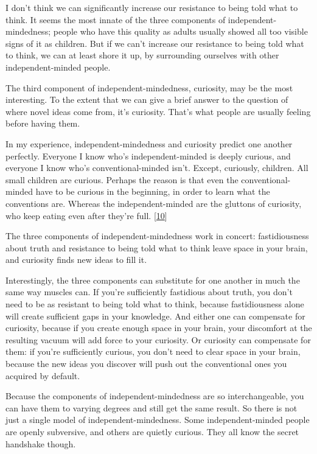 I don't think we can significantly increase our resistance to being told
what to think. It seems the most innate of the three components of
independent-mindedness; people who have this quality as adults usually
showed all too visible signs of it as children. But if we can't increase
our resistance to being told what to think, we can at least shore it up,
by surrounding ourselves with other independent-minded people.

The third component of independent-mindedness, curiosity, may be the
most interesting. To the extent that we can give a brief answer to the
question of where novel ideas come from, it's curiosity. That's what
people are usually feeling before having them.

In my experience, independent-mindedness and curiosity predict one
another perfectly. Everyone I know who's independent-minded is deeply
curious, and everyone I know who's conventional-minded isn't. Except,
curiously, children. All small children are curious. Perhaps the reason
is that even the conventional-minded have to be curious in the
beginning, in order to learn what the conventions are. Whereas the
independent-minded are the gluttons of curiosity, who keep eating even
after they're full. {[}\hyperref[f10n]{10}{]}

The three components of independent-mindedness work in concert:
fastidiousness about truth and resistance to being told what to think
leave space in your brain, and curiosity finds new ideas to fill it.

Interestingly, the three components can substitute for one another in
much the same way muscles can. If you're sufficiently fastidious about
truth, you don't need to be as resistant to being told what to think,
because fastidiousness alone will create sufficient gaps in your
knowledge. And either one can compensate for curiosity, because if you
create enough space in your brain, your discomfort at the resulting
vacuum will add force to your curiosity. Or curiosity can compensate for
them: if you're sufficiently curious, you don't need to clear space in
your brain, because the new ideas you discover will push out the
conventional ones you acquired by default.

Because the components of independent-mindedness are so interchangeable,
you can have them to varying degrees and still get the same result. So
there is not just a single model of independent-mindedness. Some
independent-minded people are openly subversive, and others are quietly
curious. They all know the secret handshake though.

